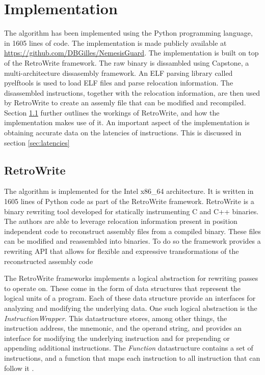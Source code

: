 
\chapter{Implementation}
\label{cha:implementation}
The algorithm has been implemented using the Python programming language, in 1605 lines of code. 
The implementation is made publicly available at  \url{https://github.com/DBGilles/NemesisGuard}. 
The implementation is built on top of the RetroWrite framework. 
The raw binary is dissambled using Capstone, a multi-architecture dissasembly framework. An ELF parsing library called pyelftools is used to load ELF files and parse relocation information. 
The disassembled instructions, together with the relocation information, are then used by RetroWrite to create an assemly file that can be modified and recompiled. 
Section \ref{sec:retrowrite} further outlines the workings of RetroWrite, and how the implementation makes use of it. 
An important aspect of the implementation is obtaining accurate data on the latencies of instructions. 
This is discussed in section  \ref{sec:latencies}


\section{RetroWrite}
\label{sec:retrowrite}
The algorithm is implemented for the Intel x86\_64 architecture. It is written in 1605 lines of Python code as part of the RetroWrite framework. 
RetroWrite is a binary rewriting tool developed for statically instrumenting C and C++ binaries. 
The authors are able to leverage relocation information present in position independent code to reconstruct assembly files from a compiled binary. 
These files can be modified and reassembled into binaries. 
To do so the framework provides a rewriting API that allows for flexible and expressive transformations of the reconstructed assembly code \cite{Dinesh2020RetroWriteSI}

The RetroWrite frameworks implements a logical abstraction for rewriting passes to operate on.
These come in the form of data structures that represent the logical units of a program.
Each of these data structure provide an interfaces for analyzing and modifying the underlying data. 
One such logical abstraction is the \textit{InstructionWrapper}. 
This datastructure stores, among other things, the instruction address, the mnemonic, and the operand string, and provides an interface
for modifying the underlying instruction and for prepending or appending additional instructions.  
The \textit{Function} datastructure contains a set of instructions, and a function that maps each instruction to all instruction that can follow it \cite{Dinesh2020RetroWriteSI, hexhive}. 

